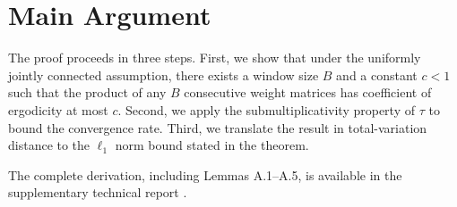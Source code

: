 \documentclass[12pt,oneside]{report}
\theoremstyle{definition}
\theoremstyle{remark}
\begin{document}
\section{Main Argument}

The proof proceeds in three steps. First, we show that under the uniformly
jointly connected assumption, there exists a window size $B$ and a constant
$c < 1$ such that the product of any $B$ consecutive weight matrices has
coefficient of ergodicity at most $c$. Second, we apply the submultiplicativity
property of $\tau$ to bound the convergence rate. Third, we translate the
result in total-variation distance to the $\ell_1$ norm bound stated in
the theorem.

The complete derivation, including Lemmas A.1--A.5, is available in the
supplementary technical report \citep{calloway2026badc}.
\end{document}
